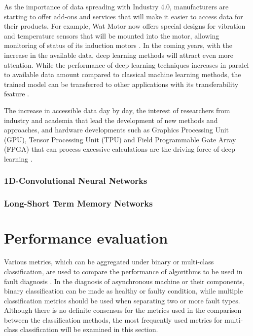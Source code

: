 As the importance of data spreading with Industry 4.0, manufacturers are starting to offer add-ons and services that will make it easier to access data for their products. For example, Wat Motor now offers special designs for vibration and temperature sensors that will be mounted into the motor, allowing monitoring of status of its induction motors \cite{wat2021}. In the coming years, with the increase in the available data, deep learning methods will attract even more attention. While the performance of deep learning techniques increases in paralel to available data amount compared to classical machine learning methods, the trained model can be transferred to other applications with its transferability feature \cite{zhang2020deep}.

The increase in accessible data day by day, the interest of researchers from industry and academia that lead the development of new methods and approaches, and hardware developments such as Graphics Processing Unit (GPU), Tensor Processing Unit (TPU) and Field Programmable Gate Array (FPGA) that can process excessive calculations are the driving force of deep learning \cite{zhao2019deep,zhang2020deep}.

\subsubsection{1D-Convolutional Neural Networks}

\subsubsection{Long-Short Term Memory Networks}

\section{Performance evaluation}

Various metrics, which can be aggregated under binary or multi-class classification, are used to compare the performance of algorithms to be used in fault diagnosis \cite{canbek2017binary,seliya2009study}. In the diagnosis of asynchronous machine or their components, binary classification can be made as healthy or faulty condition, while multiple classification metrics should be used when separating two or more fault types.  Although there is no definite consensus for the metrics used in the comparison between the classification methods, the most frequently used metrics for multi-class classification will be examined in this section.


